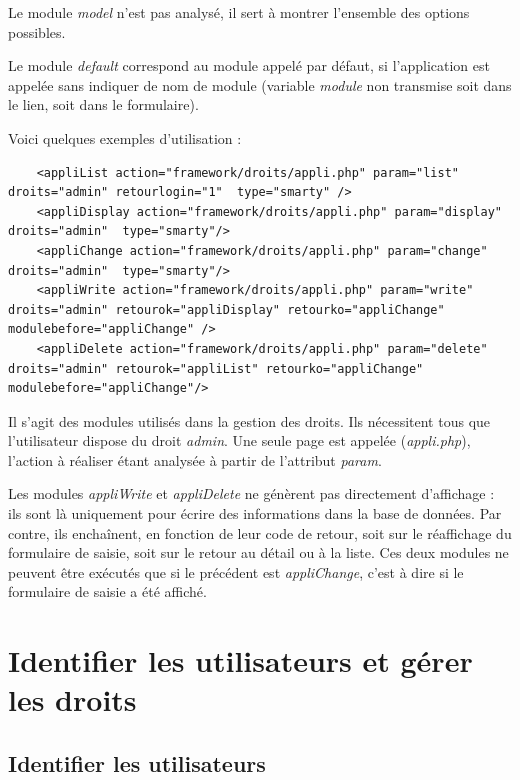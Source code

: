 Le module \textit{model} n'est pas analysé, il sert à montrer l'ensemble des options possibles. 

Le module \textit{default} correspond au module appelé par défaut, si l'application est appelée sans indiquer de nom de module (variable \textit{module} non transmise soit dans le lien, soit dans le formulaire).

Voici quelques exemples d'utilisation :
\begin{lstlisting}
	<appliList action="framework/droits/appli.php" param="list" droits="admin" retourlogin="1"  type="smarty" />
	<appliDisplay action="framework/droits/appli.php" param="display" droits="admin"  type="smarty"/>
	<appliChange action="framework/droits/appli.php" param="change" droits="admin"  type="smarty"/>
	<appliWrite action="framework/droits/appli.php" param="write" droits="admin" retourok="appliDisplay" retourko="appliChange" modulebefore="appliChange" />
	<appliDelete action="framework/droits/appli.php" param="delete" droits="admin" retourok="appliList" retourko="appliChange"  modulebefore="appliChange"/>
\end{lstlisting}

Il s'agit des modules utilisés dans la gestion des droits. Ils nécessitent tous que l'utilisateur dispose du droit \textit{admin}. Une seule page est appelée (\textit{appli.php}), l'action à réaliser étant analysée à partir de l'attribut \textit{param}.

Les modules \textit{appliWrite} et \textit{appliDelete} ne génèrent pas directement d'affichage : ils sont là uniquement pour écrire des informations dans la base de données. Par contre, ils enchaînent, en fonction de leur code de retour, soit sur le réaffichage du formulaire de saisie, soit sur le retour au détail ou à la liste.
Ces deux modules ne peuvent être exécutés que si le précédent est \textit{appliChange}, c'est à dire si le formulaire de saisie a été affiché.

\chapter{Identifier les utilisateurs et gérer les droits}\label{droits}
\section{Identifier les utilisateurs}

